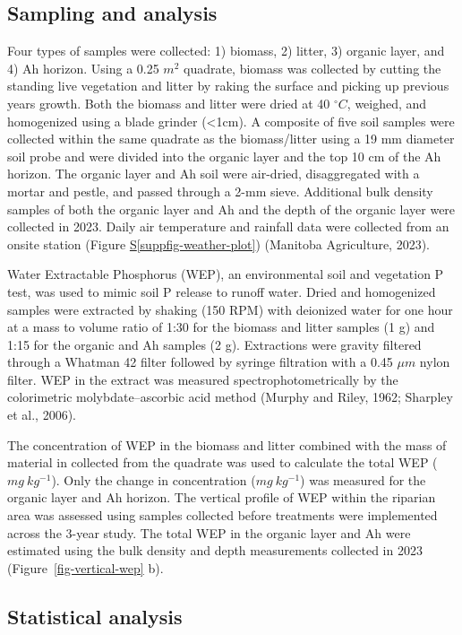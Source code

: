 \documentclass[
]{agujournal2019}
\newcommand*\quartosuppfigref[1]{Figure \hyperref[#1]{S\ref{#1}}}
\begin{document}
\subsection{Sampling and analysis}\label{sampling-and-analysis}

Four types of samples were collected: 1) biomass, 2) litter, 3) organic
layer, and 4) Ah horizon. Using a 0.25 \(m^2\) quadrate, biomass was
collected by cutting the standing live vegetation and litter by raking
the surface and picking up previous years growth. Both the biomass and
litter were dried at 40 \(^\circ C\), weighed, and homogenized using a
blade grinder (\textless1cm). A composite of five soil samples were
collected within the same quadrate as the biomass/litter using a 19 mm
diameter soil probe and were divided into the organic layer and the top
10 cm of the Ah horizon. The organic layer and Ah soil were air-dried,
disaggregated with a mortar and pestle, and passed through a 2-mm sieve.
Additional bulk density samples of both the organic layer and Ah and the
depth of the organic layer were collected in 2023. Daily air temperature
and rainfall data were collected from an onsite station
(\quartosuppfigref{suppfig-weather-plot}) (Manitoba Agriculture, 2023).

Water Extractable Phosphorus (WEP), an environmental soil and vegetation
P test, was used to mimic soil P release to runoff water. Dried and
homogenized samples were extracted by shaking (150 RPM) with deionized
water for one hour at a mass to volume ratio of 1:30 for the biomass and
litter samples (1 g) and 1:15 for the organic and Ah samples (2 g).
Extractions were gravity filtered through a Whatman 42 filter followed
by syringe filtration with a 0.45 \(\mu m\) nylon filter. WEP in the
extract was measured spectrophotometrically by the colorimetric
molybdate--ascorbic acid method (Murphy and Riley, 1962; Sharpley et
al., 2006).

The concentration of WEP in the biomass and litter combined with the
mass of material in collected from the quadrate was used to calculate
the total WEP (\(mg~kg^{-1}\)). Only the change in concentration
(\(mg~kg^{-1}\)) was measured for the organic layer and Ah horizon. The
vertical profile of WEP within the riparian area was assessed using
samples collected before treatments were implemented across the 3-year
study. The total WEP in the organic layer and Ah were estimated using
the bulk density and depth measurements collected in 2023
(Figure~\ref{fig-vertical-wep} b).

\subsection{Statistical analysis}\label{statistical-analysis}
\end{document}
